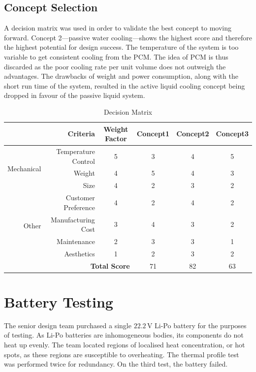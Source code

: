 \documentclass[11pt]{article}
\numberwithin{equation}{subsection} %
\newcommand{\unit}[1]{\ensuremath{\, \mathrm{#1}}}             %
\begin{document}
\subsection{Concept Selection}
A decision matrix was used in order to validate the best concept to moving forward. Concept 2---passive water cooling---shows the highest score and therefore the highest potential for design success. The temperature of the system is too variable to get consistent cooling from the PCM. The idea of PCM is thus discarded as the poor cooling rate per unit volume does not outweigh the advantages. The drawbacks of weight and power consumption, along with the short run time of the system, resulted in the active liquid cooling concept being dropped in favour of the passive liquid system.

\begin {table}[h]
  \centering  \caption{Decision Matrix}
  \label{figure:matrix}
	\begin{tabular}{r | r | c || c c c}
		\multicolumn{2}{r}{Criteria}	&Weight Factor	&Concept1	&Concept2	&Concept3 \\
		\hline
		\multirow{3}{*}{Mechanical}	
			&Temperature Control	&5	&3	&4	&5	 \\
			&Weight		&4	&5	&4	&3	 \\
			&Size			&4	&2	&3	&2	 \\ 
			\hline
		\multirow{4}{*}{Other}	
			&Customer Preference		&4	&2	&4	&2	 \\
			&Manufacturing Cost	&3	&4	&3	&2	 \\
			&Maintenance	&2	&3	&3	&1	 \\
			&Aesthetics		&1	&2	&3	&2	 \\ 
        \hline
		\multicolumn{3}{r}{\textbf{Total Score}}	&71		&82					&63		
	\end{tabular}	
\end{table}



\section{Battery Testing}\label{battery_testing}

The senior design team purchased a single $22.2\unit{V}$ Li-Po battery for the purposes of testing. As Li-Po batteries are inhomogeneous bodies, its components do not heat up evenly. The team located regions of localised heat concentration, or hot spots, as these regions are susceptible to overheating. The thermal profile test was performed twice for redundancy. On the third test, the battery failed. 
\end{document}
